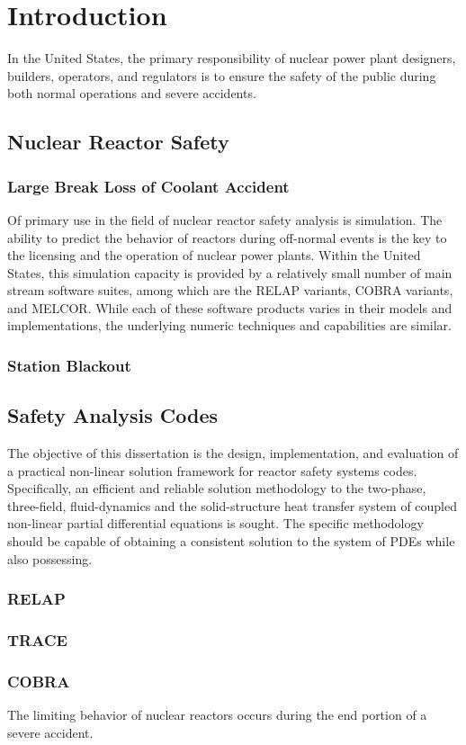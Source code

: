 \chapter{Introduction}
In the United States, the primary responsibility of nuclear power plant designers, builders, operators, and regulators is to ensure the safety of the public during both normal operations and severe accidents.

\section{Nuclear Reactor Safety}
\subsection{Large Break Loss of Coolant Accident}
Of primary use in the field of nuclear reactor safety analysis is simulation.
The ability to predict the behavior of reactors during off-normal events is the key to the licensing and the operation of nuclear power plants.
Within the United States, this simulation capacity is provided by a relatively small number of main stream software suites, among which are the RELAP variants, COBRA variants, and MELCOR.
While each of these software products varies in their models and implementations, the underlying numeric techniques and capabilities are similar.
\subsection{Station Blackout}

\section{Safety Analysis Codes}
The objective of this dissertation is the design, implementation, and evaluation of a practical non-linear solution framework for reactor safety systems codes.
Specifically, an efficient and reliable solution methodology to the two-phase, three-field, fluid-dynamics and the solid-structure heat transfer system of coupled non-linear partial differential equations is sought.
The specific methodology should be capable of obtaining a consistent solution to the system of PDEs while also possessing. \cite{Aktas1996}
\subsection{RELAP}
\subsection{TRACE}
\subsection{COBRA}
The limiting behavior of nuclear reactors occurs during the end portion of a severe accident.